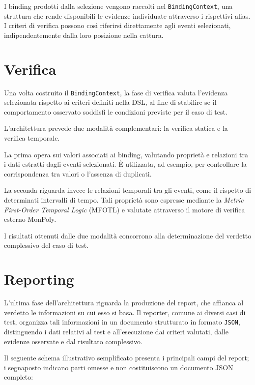 I binding prodotti dalla selezione vengono raccolti nel \texttt{BindingContext}, una struttura che rende disponibili le evidenze individuate attraverso i rispettivi alias. I criteri di verifica possono così riferirsi direttamente agli eventi selezionati, indipendentemente dalla loro posizione nella cattura.


\section{Verifica}
\label{verifica}

Una volta costruito il \texttt{BindingContext}, la fase di verifica valuta l'evidenza selezionata rispetto ai criteri definiti nella DSL, al fine di stabilire se il comportamento osservato soddisfi le condizioni previste per il caso di test.

L'architettura prevede due modalità complementari: la verifica statica e la verifica temporale.

La prima opera sui valori associati ai binding, valutando proprietà e relazioni tra i dati estratti dagli eventi selezionati. È utilizzata, ad esempio, per controllare la corrispondenza tra valori o l'assenza di duplicati.

La seconda riguarda invece le relazioni temporali tra gli eventi, come il rispetto di determinati intervalli di tempo. Tali proprietà sono espresse mediante la \emph{Metric First-Order Temporal Logic} (MFOTL) e valutate attraverso il motore di verifica esterno MonPoly.

I risultati ottenuti dalle due modalità concorrono alla determinazione del verdetto complessivo del caso di test.


\section{Reporting}\label{reporting}

L'ultima fase dell'architettura riguarda la produzione del report, che affianca al verdetto le informazioni su cui esso si basa. Il reporter, comune ai diversi casi di test, organizza tali informazioni in un documento strutturato in formato \texttt{JSON}, distinguendo i dati relativi al test e all'esecuzione dai criteri valutati, dalle evidenze osservate e dal risultato complessivo.

Il seguente schema illustrativo semplificato presenta i principali campi del report; i segnaposto indicano parti omesse e non costituiscono un documento JSON completo:

